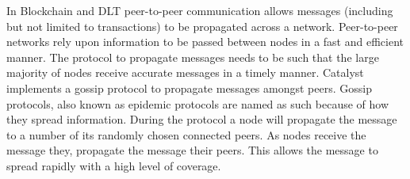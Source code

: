 In Blockchain and DLT peer-to-peer communication allows messages (including but not limited to transactions) to be propagated across a network. Peer-to-peer networks rely upon information to be passed between nodes in a fast and efficient manner. The protocol to propagate messages needs to be such that the large majority of nodes receive accurate messages in a timely manner. Catalyst implements a gossip protocol to propagate messages amongst peers. Gossip protocols, also known as epidemic protocols are named as such because of how they spread information. During the protocol a node will propagate the message to a number of its randomly chosen connected peers. As nodes receive the message they, propagate the message their peers. This allows the message to spread rapidly with a high level of coverage. 

